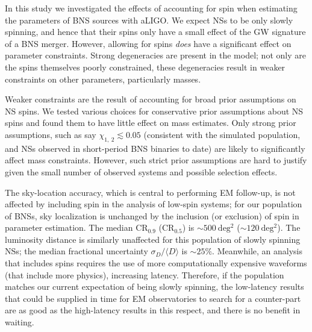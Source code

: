 In this study we investigated the effects of accounting for spin when estimating the parameters of BNS sources with aLIGO. We expect NSs to be only slowly spinning, and hence that their spins only have a small effect of the GW signature of a BNS merger. However, allowing for spins \emph{does} have a significant effect on parameter constraints. Strong degeneracies are present in the model; not only are the spins themselves poorly constrained, these degeneracies result in weaker constraints on other parameters, particularly masses.  

Weaker constraints are the result of accounting for broad prior assumptions on NS spins.  We tested various choices for conservative prior assumptions about NS spins and found them to have little effect on mass estimates.  Only strong prior assumptions, such as say $\chi_{1,~2}\lesssim 0.05$ (consistent with the simulated population, and NSs observed in short-period BNS binaries to date) are likely to significantly affect mass constraints.  However, such strict prior assumptions are hard to justify given the small number of observed systems and possible selection effects. 

The sky-location accuracy, which is central to performing EM follow-up, is not affected by including spin in the analysis of low-spin systems; for our population of BNSs, sky localization is unchanged by the inclusion (or exclusion) of spin in parameter estimation. The median $\mathrm{CR}_{0.9}$ ($\mathrm{CR}_{0.5}$) is $\sim 500~\mathrm{deg^2}$ ($\sim 120~\mathrm{deg^2}$). The luminosity distance is similarly unaffected for this population of slowly spinning NSs; the median fractional uncertainty $\sigma_D/\langle D \rangle$ is $\sim 25\%$.  Meanwhile, an analysis that includes spins requires the use of more computationally expensive waveforms (that include more physics), increasing latency.  Therefore, if the population matches our current expectation of being slowly spinning, the low-latency results that could be supplied in time for EM observatories to search for a counter-part are as good as the high-latency results in this respect, and there is no benefit in waiting.


  
  
  
  
  
  
  
